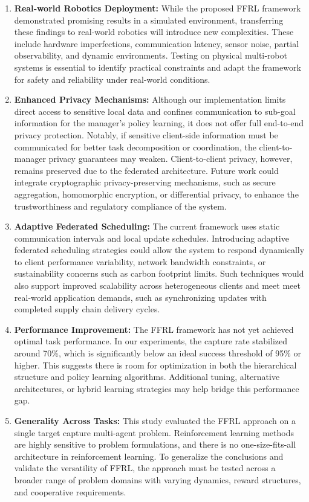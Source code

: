 \documentclass[12pt,a4paper,twoside,openany]{book}
\begin{document}
\begin{enumerate}
  \item \textbf{Real‑world Robotics Deployment:} While the proposed FFRL framework demonstrated promising results in a simulated environment, transferring these findings to real‑world robotics will introduce new complexities. These include hardware imperfections, communication latency, sensor noise, partial observability, and dynamic environments. Testing on physical multi‑robot systems is essential to identify practical constraints and adapt the framework for safety and reliability under real-world conditions.

  \item \textbf{Enhanced Privacy Mechanisms:} Although our implementation limits direct access to sensitive local data and confines communication to sub-goal information for the manager’s policy learning, it does not offer full end-to-end privacy protection. Notably, if sensitive client-side information must be communicated for better task decomposition or coordination, the client-to-manager privacy guarantees may weaken. Client-to-client privacy, however, remains preserved due to the federated architecture. Future work could integrate cryptographic privacy-preserving mechanisms, such as secure aggregation, homomorphic encryption, or differential privacy, to enhance the trustworthiness and regulatory compliance of the system.

  \item \textbf{Adaptive Federated Scheduling:} The current framework uses static communication intervals and local update schedules. Introducing adaptive federated scheduling strategies could allow the system to respond dynamically to client performance variability, network bandwidth constraints, or sustainability concerns such as carbon footprint limits. Such techniques would also support improved scalability across heterogeneous clients and meet meet real-world application demands, such as synchronizing updates with completed supply chain delivery cycles.

  \item \textbf{Performance Improvement:} The FFRL framework has not yet achieved optimal task performance. In our experiments, the capture rate stabilized around 70\%, which is significantly below an ideal success threshold of 95\% or higher. This suggests there is room for optimization in both the hierarchical structure and policy learning algorithms. Additional tuning, alternative architectures, or hybrid learning strategies may help bridge this performance gap.

  \item \textbf{Generality Across Tasks:} This study evaluated the FFRL approach on a single target capture multi-agent problem. Reinforcement learning methods are highly sensitive to problem formulations, and there is no one-size-fits-all architecture in reinforcement learning. To generalize the conclusions and validate the versatility of FFRL, the approach must be tested across a broader range of problem domains with varying dynamics, reward structures, and cooperative requirements.
\end{enumerate}
\end{document}
